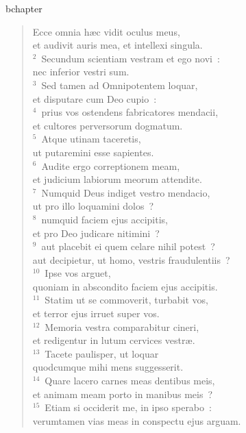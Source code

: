 bchapter\begin{flushleft}\begin{verse}\vspace{-19pt}\hspace{6pt}Ecce omnia h\ae c vidit oculus meus,\\\hspace{6pt} et audivit auris mea, et intellexi singula.\\
${}^{2}$~Secundum scientiam vestram et ego novi~:\\ nec inferior vestri sum.\\
${}^{3}$~Sed tamen ad Omnipotentem loquar,\\ et disputare cum Deo cupio~:\\
${}^{4}$~prius vos ostendens fabricatores mendacii,\\ et cultores perversorum dogmatum.\\
${}^{5}$~Atque utinam taceretis,\\ ut putaremini esse sapientes.\\
${}^{6}$~Audite ergo correptionem meam,\\ et judicium labiorum meorum attendite.\\
${}^{7}$~Numquid Deus indiget vestro mendacio,\\ ut pro illo loquamini dolos~?\\
${}^{8}$~numquid faciem ejus accipitis,\\ et pro Deo judicare nitimini~?\\
${}^{9}$~aut placebit ei quem celare nihil potest~?\\ aut decipietur, ut homo, vestris fraudulentiis~?\\
${}^{10}$~Ipse vos arguet,\\ quoniam in abscondito faciem ejus accipitis.\\
${}^{11}$~Statim ut se commoverit, turbabit vos,\\ et terror ejus irruet super vos.\\
${}^{12}$~Memoria vestra comparabitur cineri,\\ et redigentur in lutum cervices vestr\ae .\\
${}^{13}$~Tacete paulisper, ut loquar\\ quodcumque mihi mens suggesserit.\\
${}^{14}$~Quare lacero carnes meas dentibus meis,\\ et animam meam porto in manibus meis~?\\
${}^{15}$~Etiam si occiderit me, in ipso sperabo~:\\ verumtamen vias meas in conspectu ejus arguam.\\

\end{verse}
\end{flushleft}

